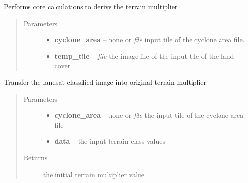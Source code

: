 \documentclass[letterpaper,10pt,english]{sphinxmanual}
\begin{document}

\begin{fulllineitems}
\label{docs/terrain:terrain_mult.terrain}
Performs core calculations to derive the terrain multiplier
\begin{quote}\begin{description}
\item[{Parameters}] \leavevmode\begin{itemize}
\item {} 
\textbf{cyclone\_area} -- none or \emph{file} input tile of the cyclone area file.

\item {} 
\textbf{temp\_tile} -- \emph{file} the image file of the input tile of the land cover

\end{itemize}

\end{description}\end{quote}

\end{fulllineitems}



\begin{fulllineitems}
\label{docs/terrain:terrain_mult.terrain_class2mz_orig}
Transfer the landsat classified image into original terrain multiplier
\begin{quote}\begin{description}
\item[{Parameters}] \leavevmode\begin{itemize}
\item {} 
\textbf{cyclone\_area} -- none or \emph{file} the input tile of the cyclone area file

\item {} 
\textbf{data} --  the input terrain class values

\end{itemize}

\item[{Returns}] \leavevmode
{} the initial terrain multiplier value

\end{description}\end{quote}

\end{fulllineitems}
\end{document}
